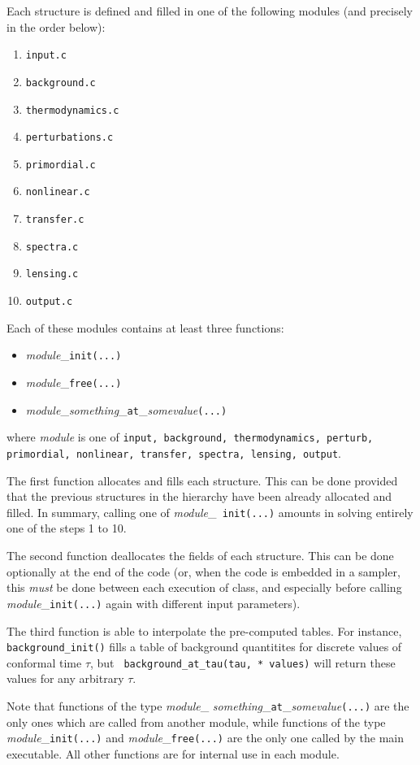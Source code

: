 \documentclass{article}
\begin{document}
Each structure is defined and filled in one of the following modules
(and precisely in the order below):
\begin{enumerate}
\item {\tt  input.c }
\item {\tt  background.c }
\item {\tt  thermodynamics.c   }
\item {\tt  perturbations.c    }
\item {\tt  primordial.c  } 
\item {\tt  nonlinear.c  } 
\item {\tt  transfer.c   }
\item {\tt  spectra.c     }
\item {\tt  lensing.c     }
\item {\tt  output.c     }
\end{enumerate}
Each of these modules contains at least three functions:
\begin{itemize}
\item {\it module}\_{\tt init(...)}
\item {\it module}\_{\tt free(...)}
\item {\it module}\_{\it something}\_{\tt at}\_{\it somevalue}{\tt(...)}
\end{itemize}
where {\it module} is one of {\tt input, background, thermodynamics, perturb, primordial, nonlinear, transfer, spectra, lensing, output}.


The first function allocates and fills each structure. This can be
done provided that the previous structures in the hierarchy have been
already allocated and filled. In summary, calling one of {\it module}\_{\tt
init(...)} amounts in solving entirely one of the steps 1 to 10.

The second function deallocates the fields of each structure. This
can be done optionally at the end of the code (or, when the code is embedded
in a sampler, this {\it must} be done 
between each execution of {\sc class}, and especially before calling {\it
module}\_{\tt init(...)} again with different input parameters).

The
third function is able to interpolate the pre-computed tables. For
instance, {\tt background\_init()} fills a table of background
quantitites for discrete values of conformal time $\tau$, but {\tt
background\_at\_tau(tau, * values)} will return these values for any
arbitrary $\tau$. 

Note that functions of the type {\it module}\_{\it
something}\_{\tt at}\_{\it somevalue}{\tt(...)} are the only ones which are
called from another module, while functions of the type {\it
module}\_{\tt init(...)} and {\it module}\_{\tt free(...)} are the only
one called by the main executable.  All other functions are for
internal use in each module. 
\end{document}
